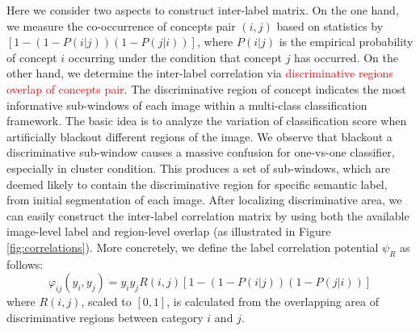 Here we consider two aspects to construct inter-label matrix. On the one hand,  we measure the co-occurrence of concepts pair $(i,j)$ based on statistics by $[1-(1-P(i|j))(1-P(j|i))]$, where $P(i|j)$ is
 the empirical
 probability of concept $i$ occurring under the condition that concept $j$ has occurred.
On the other hand, we determine the inter-label correlation via \textcolor{red}{discriminative regions overlap of concepts pair}. The discriminative region of concept indicates the most informative sub-windows of each image within a multi-class classification framework. The basic idea is to analyze the variation of classification score when artificially blackout different regions of the image. We observe that blackout a discriminative sub-window causes a massive confusion for one-vs-one classifier, especially in cluster condition. This produces a set of sub-windows, which are deemed likely to contain the discriminative region for specific semantic label, from initial segmentation of each image. After localizing discriminative area, we can easily construct the inter-label correlation matrix by using both the available image-level label and region-level overlap (as illustrated in Figure \ref{fig:correlations}). More concretely, we define the label correlation potential $\psi_R$ as follows:
\begin{equation}
    \varphi_{ij}(y_i,y_j) =y_iy_j R(i,j)[1-(1-P(i|j))(1-P(j|i))]
\end{equation}
where $R(i,j)$, scaled to $[0,1]$, is calculated from the overlapping area of discriminative regions between category $i$ and $j$.

